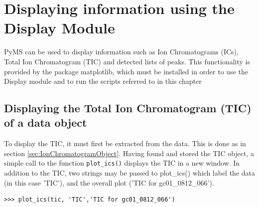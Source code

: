 

\chapter{Displaying information using the Display Module}

PyMS can be used to display information such as Ion Chromatograms (ICs), 
Total Ion Chromatogram (TIC) and detected lists of peaks. This functionality
is provided by the package matplotlib, which must be installed in order 
to use the Display module and to run the scripts referred to in this chapter



\section{Displaying the Total Ion Chromatogram (TIC) of a data object}
\label{sec:DisplayTic}

To display the TIC, it must first be extracted from the data. This is done as 
in section \ref{sec:IonChromatogramObject}. Having found
and stored the TIC object, a simple call to the function {\tt plot\_ics()} displays
the TIC in a new window. In addition to the TIC, two strings may be passed to plot\_ics()
which label the data (in this case 'TIC'), and the overall plot ('TIC for gc01\_0812\_066').

\begin{verbatim}
>>> plot_ics(tic, 'TIC','TIC for gc01_0812_066')
\end{verbatim}

